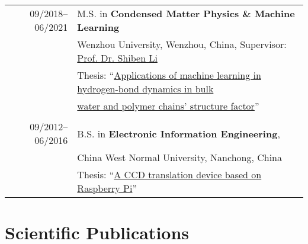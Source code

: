 \documentclass[a4paper,10pt]{article} %
\begin{document}
\begin{tabular}{r|l}	
09/2018--06/2021 				    & M.S. in \textbf{Condensed Matter Physics \& Machine Learning}\\
                                    & Wenzhou University, Wenzhou, China, Supervisor: \href{http://slxy.wzu.edu.cn/lsb.pdf}{Prof. Dr. Shiben Li}\\
                                    & Thesis: “\href{https://nbviewer.jupyter.org/github/HuangJiaLian/DataBase0/blob/master/uPic/2021_07_24_12_HuangJieBiYeDaBian.pdf}{Applications of machine learning in hydrogen-bond dynamics in bulk} \\& \href{https://nbviewer.jupyter.org/github/HuangJiaLian/DataBase0/blob/master/uPic/2021_07_24_12_HuangJieBiYeDaBian.pdf}{water and polymer chains’ structure factor}”\\

\multicolumn{2}{c}{} \\	%

09/2012--06/2016                    & B.S. in \textbf{Electronic Information Engineering}, \\                    & China West Normal University, Nanchong, China\\
					 & Thesis: “\href{https://nbviewer.jupyter.org/github/HuangJiaLian/DataBase0/blob/master/uPic/2021_07_24_13_CCD_translation_device.pdf}{A CCD translation device based on Raspberry Pi}”		
\end{tabular}

%	
%
\section{Scientific Publications}  
\end{document}
